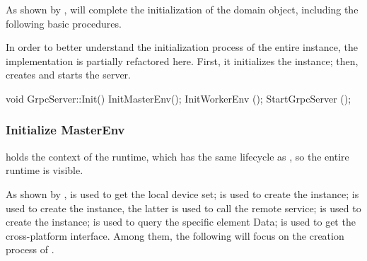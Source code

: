 \begin{content}
As shown by ,  will complete the initialization of the  domain object, including the following  basic procedures.

\begin{enum}
    \begin{enum}
    \begin{nitemize}
    \end{nitemize}
    \begin{nitemize}          
    \end{nitemize}      
    \end{enum}
\end{enum}

In order to better understand the initialization process of the entire  instance, the implementation is partially refactored here. First, it initializes the  instance; then, creates and starts the  server.

\begin{leftbar}
\begin{c++}
void GrpcServer::Init() {
  InitMasterEnv();
  InitWorkerEnv ();
  StartGrpcServer ();
}
\end{c++}
\end{leftbar}

\subsubsection{Initialize MasterEnv}

 holds the context of the  runtime, which has the same lifecycle as , so the entire  runtime is visible.

As shown by ,  is used to get the local device set;  is used to create the  instance;  is used to create the  instance, the latter is used to call the remote  service;  is used to create the  instance;  is used to query the specific  element Data;  is used to get the cross-platform  interface. Among them, the following will focus on the creation process of .


\end{content}
